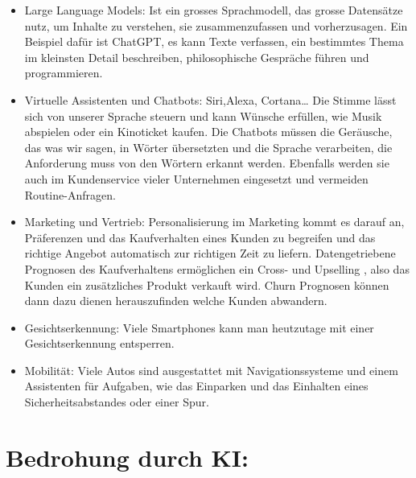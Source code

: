 \documentclass{report}
\begin{document}
\begin{itemize}
    \item Large Language Models: Ist ein grosses Sprachmodell, das grosse Datensätze nutz, um Inhalte zu verstehen, sie zusammenzufassen und vorherzusagen. Ein Beispiel dafür ist ChatGPT, es kann Texte verfassen, ein bestimmtes Thema im kleinsten Detail beschreiben, philosophische Gespräche führen und programmieren.
    \item Virtuelle Assistenten und Chatbots: Siri,Alexa, Cortana… Die Stimme lässt sich von unserer Sprache steuern und kann Wünsche erfüllen, wie Musik abspielen oder ein Kinoticket kaufen. Die Chatbots müssen die Geräusche, das was wir sagen, in Wörter übersetzten und die Sprache verarbeiten, die Anforderung muss von den Wörtern erkannt werden. Ebenfalls werden sie auch im Kundenservice vieler Unternehmen eingesetzt und vermeiden Routine-Anfragen.
    \item Marketing und Vertrieb: Personalisierung im Marketing kommt es darauf an, Präferenzen und das Kaufverhalten eines Kunden zu begreifen und das richtige Angebot automatisch zur richtigen Zeit zu liefern. Datengetriebene Prognosen des Kaufverhaltens ermöglichen ein Cross- und Upselling , also das  Kunden ein zusätzliches Produkt verkauft wird. Churn Prognosen können dann dazu dienen herauszufinden welche Kunden abwandern.
    \item Gesichtserkennung: Viele Smartphones kann man heutzutage mit einer Gesichtserkennung entsperren.
    \item Mobilität: Viele Autos sind ausgestattet mit Navigationssysteme und einem Assistenten für Aufgaben, wie das Einparken und das Einhalten eines Sicherheitsabstandes oder einer Spur.
    
\end{itemize}

\section {Bedrohung durch KI:}
\end{document}
